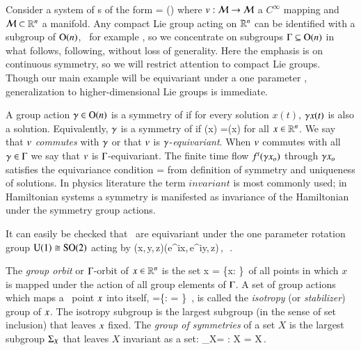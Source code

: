

Consider a system of \ode s of the form
\beq
	\dot{\ssp} = \vf(\ssp)
	\label{eq:difeq}
\eeq
where $v: {\cal M} \rightarrow {\cal M}$ a $C^\infty$ mapping and ${\cal M}\subset\mathbb{R}^{n}$
a manifold. Any compact Lie group acting on $\mathbb{R}^{n}$ can be identified
with a subgroup of $\textrm{O}(n)$, \cf\ for example ,
so we concentrate on subgroups $\Gamma\subseteq\textrm{O}(n)$ in what
follows, following, without loss of generality.
%
Here the emphasis is on continuous symmetry, so we will
restrict attention to compact Lie groups. Though our main
example will be equivariant under a one parameter ,
generalization to higher-dimensional Lie groups is immediate.

A group action $\gamma\in\textrm{O}(n)$ is a symmetry of
 if for every solution $x(t)$, $\gamma x(t)$ is
also a solution. Equivalently, $\gamma$ is a symmetry of
 if \beq
	\vf(\LieEl x) =\LieEl \vf(x)
	\label{eq:equiv} \eeq for all $x\in\mathbb{R}^{n}$. We say that
$v$ \emph{commutes} with $\gamma$ or that $v$ is
$\gamma$-\emph{equivariant}. When $v$ commutes with all
$\gamma\in\Gamma$ we say that $v$ is $\Gamma$-equivariant.
The finite time flow ${f^{t}(\gamma x_o)}$ through $\gamma
x_o$ satisfies the equivariance condition
\beq\label{eq:equivFinite} =\LieEl{} \eeq from definition of symmetry and
uniqueness of solutions. In physics literature the term
$invariant$ is most commonly used; in
Hamiltonian systems a symmetry is manifested as invariance of the
Hamiltonian under the symmetry group actions.

It can easily be checked that \CLe\ are equivariant under the one parameter rotation
group $\textrm{U}(1)\cong\textrm{SO}(2)$ acting by
\beq\label{eq:SO2cle}
	(x,\,y,\,z)\mapsto (e^{i\theta}x,\,e^{i\theta}y,\,z)\,,\ \theta\in[0,2\pi]\,.
\eeq

The \emph{group orbit} or $\Gamma$-orbit of
$x\in\mathbb{R}^{n}$ is the set
\beq
	\Group x = \{\Glmn x: \Glmn\in\Group\}\,
\eeq
of all points in which $x$ is mapped under the action of all
group elements of $\Gamma$.
A set of group actions which maps a \statesp\ point $x$ into itself,
\beq
\stab{\ssp} =\{\Glmn \in \Group: \Glmn \ssp = \ssp \}
    \,,
is called the \emph{isotropy} (or \emph{stabilizer})  group of $\ssp$.
The isotropy subgroup is the largest subgroup (in the
sense of set inclusion) that leaves $\ssp$ fixed.
The \emph{group of symmetries} of a set $X$ is the largest
subgroup $\Subgroup_X$ that leaves $X$ invariant as a set:
\beq
	\Subgroup_X= {\Glmn: \Glmn X = X}\,.
\eeq

